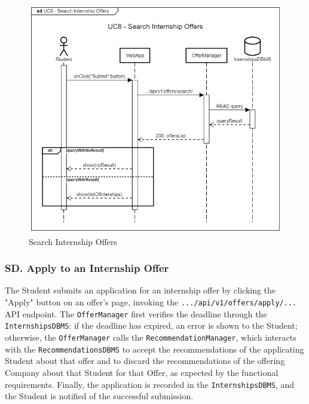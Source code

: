 \begin{figure}[H]
    \begin{center}
         \includegraphics[width=1\linewidth]{LaTeXCode/images/SequenceDiagrams/UC8-sequenceDiagram.png}
         \caption{Search Internship Offers}
         \label{fig:search_offer_sd}
     \end{center}
\end{figure}

\subsubsection*{SD\cuc. Apply to an Internship Offer}
\label{subsubsec:apply_to_internships_sd}
The Student submits an application for an internship offer by clicking the "Apply" button on an offer's page, invoking the \texttt{.../api/v1/offers/apply/...} API endpoint. The \texttt{OfferManager} first verifies the deadline through the \texttt{InternshipsDBMS}: if the deadline has expired, an error is shown to the Student; otherwise, the \texttt{OfferManager} calls the \texttt{RecommendationManager}, which interacts with the \texttt{RecommendationsDBMS} to accept the recommendations of the applicating Student about that offer and to discard the recommendations of the offering Company about that Student for that Offer, as expected by the functional requirements. Finally, the application is recorded in the \texttt{InternshipsDBMS}, and the Student is notified of the successful submission.

